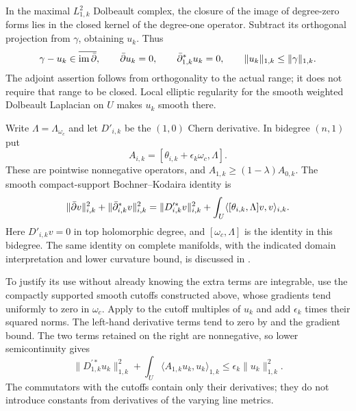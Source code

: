 In the maximal $L^2_{1,k}$ Dolbeault complex, the closure of the image
of degree-zero forms lies in the closed kernel of the degree-one
operator.  Subtract its orthogonal projection from $\gamma$, obtaining
$u_k$.  Thus
\begin{equation}\label{eq:reduced-harmonic-representative}
 \gamma-u_k\in\overline{\operatorname{im}\bar\partial},\qquad
 \bar\partial u_k=0,\qquad \bar\partial^*_{1,k}u_k=0,\qquad
 \|u_k\|_{1,k}\le\|\gamma\|_{1,k}.
\end{equation}
The adjoint assertion follows from orthogonality to the actual range;
it does not require that range to be closed.  Local elliptic
regularity for the smooth weighted Dolbeault Laplacian on $U$ makes
$u_k$ smooth there.

Write $\Lambda=\Lambda_{\omega_c}$ and let $D'_{i,k}$ be the
$(1,0)$ Chern derivative.  In bidegree $(n,1)$ put
\[
 A_{i,k}=[\theta_{i,k}+\epsilon_k\omega_c,\Lambda].
\]
These are pointwise nonnegative operators, and
$A_{1,k}\ge(1-\lambda)A_{0,k}$.  The smooth compact-support
Bochner--Kodaira identity is
\begin{equation}\label{eq:bochner-top-degree}
 \|\bar\partial v\|_{i,k}^2+\|\bar\partial^*_{i,k}v\|_{i,k}^2
 =\|D_{i,k}^{\prime *}v\|_{i,k}^2
       +\int_U\langle[\theta_{i,k},\Lambda]v,v\rangle_{i,k}.
\end{equation}
Here $D'_{i,k}v=0$ in top holomorphic degree, and
$[\omega_c,\Lambda]$ is the identity in this bidegree.  The same
identity on complete manifolds, with the indicated domain
interpretation and lower curvature bound, is discussed in
\cite[Proposition~2.4]{Matsumura2018}.

To justify its use without already knowing the extra terms are
integrable, use the compactly supported smooth cutoffs constructed above, whose
gradients tend uniformly to zero in $\omega_c$.  Apply
 to the cutoff multiples of $u_k$ and add
$\epsilon_k$ times their squared norms.  The left-hand derivative
terms tend to zero by  and
the gradient bound.  The two terms retained on the right are
nonnegative, so lower semicontinuity gives
\begin{equation}\label{eq:source-bochner-energy}
 \|D_{1,k}^{\prime *}u_k\|_{1,k}^2
   +\int_U\langle A_{1,k}u_k,u_k\rangle_{1,k}
 \le\epsilon_k\|u_k\|_{1,k}^2.
\end{equation}
The commutators with the cutoffs contain only their derivatives; they
do not introduce constants from derivatives of the varying line
metrics.

